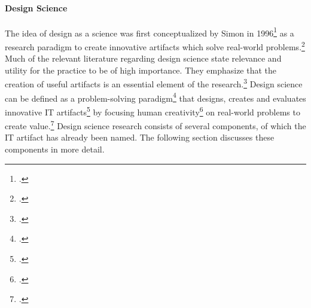
\paragraph{Design Science}
The idea of design as a science was first conceptualized by Simon in 1996\footcite[Cf.][]{Simonsciencesartificial1996} as a research paradigm to create innovative artifacts which solve real-world problems.\footcite[Cf.][p.9]{HevnerDesignResearchInformation2010}
Much of the relevant literature regarding design science state relevance and utility for the practice to be of high importance. They emphasize that the creation of useful artifacts is an essential element of the research.\footcites[Cf.][p.253, 254]{MarchDesignnaturalscience1995}[cf.][p.9, 11]{HevnerDesignResearchInformation2010}[cf.][p.77]{HevnerDesignScienceResearch2004}[cf.][p.1]{PapalambrosDesignScienceWhy2015}[cf.][p.330,342]{GregorPositioningpresentingdesign2013} Design science can be defined as a problem-solving paradigm\footcite[Cf.][p.77]{HevnerDesignScienceResearch2004} that designs, creates and evaluates innovative \ac{IT} artifacts\footcite[Cf.][p.90]{HevnerDesignScienceResearch2004} by focusing human creativity\footcite[Cf.][p.13]{HevnerDesignResearchInformation2010} on real-world problems to create value.\footcite[Cf.][p.1]{PapalambrosDesignScienceWhy2015} %
Design science research consists of several components, of which the \ac{IT} artifact has already been named. The following section discusses these components in more detail.

